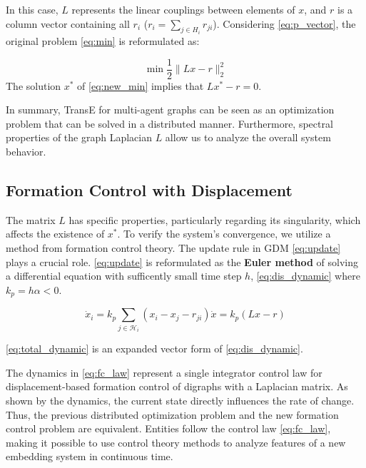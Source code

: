 \documentclass[letterpaper, 10 pt, conference]{ieeeconf}  %
\begin{document}
In this case, \( L \) represents the linear couplings between elements of \( x \), and \( r \) is a column vector containing all \( r_i \) (\( r_i = \sum_{j \in H_i} r_{ji} \)). Considering \eqref{eq:p_vector}, the original problem \eqref{eq:min} is reformulated as:

\begin{equation}
    \min \frac{1}{2} \|Lx - r\|_{2}^{2}
    \label{eq:new_min}
\end{equation}
\noindent The solution \( x^* \) of \eqref{eq:new_min} implies that \( Lx^* - r = 0 \). %

In summary, TransE for multi-agent graphs can be seen as an optimization problem that can be solved in a distributed manner. Furthermore, spectral properties of the graph Laplacian \( L \) allow us to analyze the overall system behavior.

\subsection{Formation Control with Displacement}

The matrix \( L \) has specific properties, particularly regarding its singularity, which affects the existence of \( x^* \). To verify the system’s convergence, we utilize a method from formation control theory. The update rule in GDM \eqref{eq:update} plays a crucial role. \eqref{eq:update} is reformulated as the \textbf{Euler method} of solving a differential equation with sufficently small time step $h$, \eqref{eq:dis_dynamic} where $k_p = h \alpha < 0$. 


\begin{subequations}\label{eq:fc_law}
\begin{equation}\label{eq:dis_dynamic}
    \dot{x}_i = k_p \sum_{j \in \mathcal{H}_i} (x_{i} - x_{j} - r_{ji})
\end{equation}
\begin{equation}\label{eq:total_dynamic}
    \dot{x} = k_p(Lx - r)
\end{equation}
\end{subequations}

\eqref{eq:total_dynamic} is an expanded vector form of \eqref{eq:dis_dynamic}.

\noindent The dynamics in \eqref{eq:fc_law} represent a single integrator control law for displacement-based formation control of digraphs with a Laplacian matrix. As shown by the dynamics, the current state directly influences the rate of change. Thus, the previous distributed optimization problem and the new formation control problem are equivalent. Entities follow the control law \eqref{eq:fc_law}, making it possible to use control theory methods to analyze features of a new embedding system in continuous time.
\end{document}
